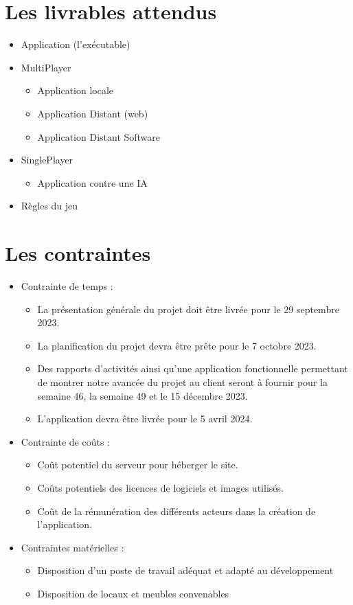 \documentclass[a4paper, 12pt,table]{report}
\begin{document}
\section{Les livrables attendus}
\begin{itemize}
	\item{Application (l'exécutable)}
	\item{MultiPlayer}
    \begin{itemize}
        \item{Application locale}
        \item{Application Distant (web)}
        \item{Application Distant Software}
    \end{itemize}
    \item{SinglePlayer}
    \begin{itemize}
        \item{Application contre une IA}
    \end{itemize}
    \item{Règles du jeu}
\end{itemize}

\section{Les contraintes}
\begin{itemize}
	\item{Contrainte de temps :}
 \begin{itemize}
     \item{La présentation générale du projet doit être livrée pour le 29 septembre 2023.}
     \item{La planification du projet devra être prête pour le 7 octobre 2023.}
     \item{Des rapports d’activités ainsi qu’une application fonctionnelle permettant de montrer notre avancée du projet au client seront à fournir pour la semaine 46, la semaine 49 et le 15 décembre 2023.}
     \item{L’application devra être livrée pour le 5 avril 2024.}
 \end{itemize}  
    \item{Contrainte de coûts :}
    \begin{itemize}
        \item{Coût potentiel du serveur pour héberger le site.}
        \item{Coûts potentiels des licences de logiciels et images utilisés.}
        \item{Coût de la rémunération des différents acteurs dans la création de l’application.}
    \end{itemize}
    \item{Contraintes matérielles :}
    \begin{itemize}
        \item{Disposition d'un poste de travail adéquat et adapté au développement}
        \item{Disposition de locaux et meubles convenables}
    \end{itemize}
\end{itemize}
\end{document}
